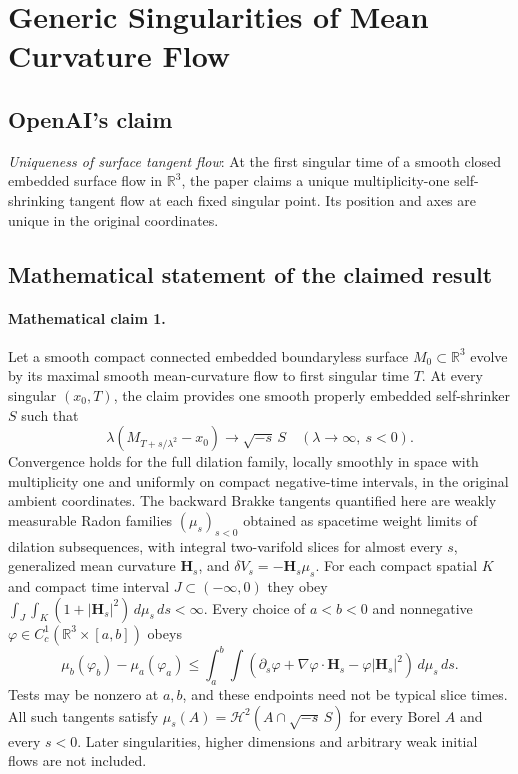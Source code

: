 \documentclass[11pt]{article}
\begin{document}
\section*{Generic Singularities of Mean Curvature Flow}

\subsection{OpenAI's claim}
\textit{Uniqueness of surface tangent flow}: At the first singular time of a smooth closed embedded surface flow in $\mathbb R^3$, the paper claims a unique multiplicity-one self-shrinking tangent flow at each fixed singular point. Its position and axes are unique in the original coordinates.

\subsection{Mathematical statement of the claimed result}
\paragraph{Mathematical claim 1.} Let a smooth compact connected embedded boundaryless surface $M_0\subset\mathbb R^3$ evolve by its maximal smooth mean-curvature flow to first singular time $T$. At every singular $(x_0,T)$, the claim provides one smooth properly embedded self-shrinker $S$ such that \[\lambda(M_{T+s/\lambda^2}-x_0)\longrightarrow\sqrt{-s}\,S\quad(\lambda\to\infty,\ s<0).\] Convergence holds for the full dilation family, locally smoothly in space with multiplicity one and uniformly on compact negative-time intervals, in the original ambient coordinates. The backward Brakke tangents quantified here are weakly measurable Radon families $(\mu_s)_{s<0}$ obtained as spacetime weight limits of dilation subsequences, with integral two-varifold slices for almost every $s$, generalized mean curvature $\mathbf H_s$, and $\delta V_s=-\mathbf H_s\mu_s$. For each compact spatial $K$ and compact time interval $J\subset(-\infty,0)$ they obey $\int_J\int_K(1+|\mathbf H_s|^2)\,d\mu_s\,ds<\infty$. Every choice of $a<b<0$ and nonnegative $\varphi\in C_c^1(\mathbb R^3\times[a,b])$ obeys \[\mu_b(\varphi_b)-\mu_a(\varphi_a)\le\int_a^b\int(\partial_s\varphi+\nabla\varphi\cdot\mathbf H_s-\varphi|\mathbf H_s|^2)\,d\mu_s\,ds.\] Tests may be nonzero at $a,b$, and these endpoints need not be typical slice times. All such tangents satisfy $\mu_s(A)=\mathcal H^2(A\cap\sqrt{-s}\,S)$ for every Borel $A$ and every $s<0$. Later singularities, higher dimensions and arbitrary weak initial flows are not included.
\end{document}
